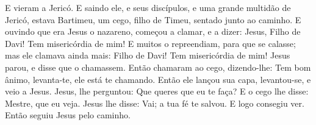 {  E vieram a Jericó. E saindo ele, e seus discípulos, e uma grande multidão de Jericó, estava Bartimeu, um cego, filho de Timeu, sentado junto ao caminho.
  E ouvindo que era Jesus o nazareno, começou a clamar, e a dizer: Jesus, Filho de Davi! Tem misericórdia de mim!
  E muitos o repreendiam, para que se calasse; mas ele clamava ainda mais: Filho de Davi! Tem misericórdia de mim!
  Jesus parou, e disse que o chamassem. Então chamaram ao cego, dizendo-lhe: Tem bom ânimo, levanta-te, ele está te chamando.
  Então ele lançou sua capa, levantou-se, e veio a Jesus.
  Jesus, lhe perguntou: Que queres que eu te faça? E o cego lhe disse: Mestre, que eu veja.
  Jesus lhe disse: Vai; a tua fé te salvou. E logo consegiu ver. Então seguiu Jesus pelo caminho.
\par }

